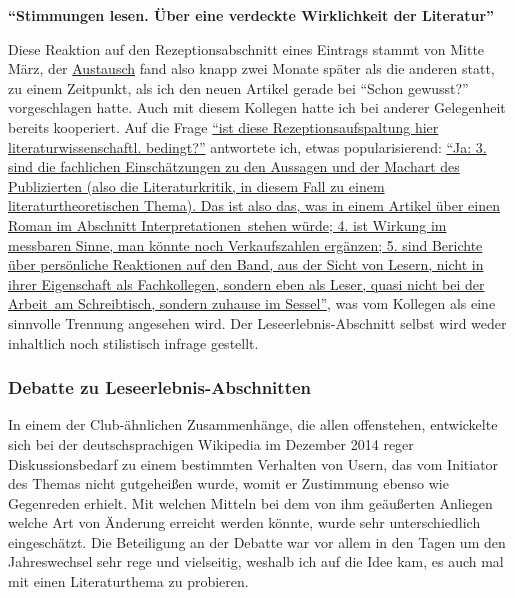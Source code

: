 \documentclass[fontsize=12pt]{scrartcl}
\begin{document}
\textbf{"`Stimmungen lesen. \"Uber eine verdeckte Wirklichkeit der Li\-te\-ra\-tur"'}

Diese Reaktion auf den Rezeptionsabschnitt eines Eintrags stammt von Mitte M\"arz, der \href{https://de.wikipedia.org/w/index.php?title=Diskussion:Stimmungen_lesen._\%C3\%9Cber_eine_verdeckte_Wirklichkeit_der_Literatur&oldid=139806486}{Austausch} fand also knapp zwei Monate sp\"ater als die anderen statt, zu einem Zeitpunkt, als ich den neuen Artikel gerade bei "`Schon gewusst?"' vorgeschlagen hatte. Auch mit diesem Kollegen\textsuperscript{\tiny *} hatte ich bei an\-de\-rer Gelegenheit bereits kooperiert. Auf die Frage \href{https://de.wikipedia.org/w/index.php?title=Diskussion:Stimmungen_lesen._\%C3\%9Cber_eine_verdeckte_Wirklichkeit_der_Literatur&diff=next&oldid=139796600}{"`ist diese Rezeptionsaufspaltung \mbox{hier} li\-te\-ra\-tur\-wissenschaftl. bedingt?"'} antwortete ich, etwas popularisierend: \href{https://de.wikipedia.org/w/index.php?title=Diskussion:Stimmungen_lesen._\%C3\%9Cber_eine_verdeckte_Wirklichkeit_der_Literatur&diff=next&oldid=139796600}{"`Ja: 3. sind die fachlichen Einsch\"atzungen zu den Aussagen und der Machart des Pu\-bli\-zierten (also die Li\-te\-ra\-tur\-kritik, in diesem Fall zu einem li\-te\-ra\-tur\-theo\-retischen Thema). Das ist also das, was in einem Artikel \"uber einen Roman im Abschnitt \flq Interpretationen\frq\, stehen w\"urde; 4. ist Wirkung im messbaren Sinne, man k\"onnte noch Verkaufszahlen erg\"anzen; 5. sind Berichte \"uber pers\"onliche Reaktionen auf den Band, aus der Sicht von \flq Lesern\frq, nicht in ihrer Eigenschaft als Fachkollegen, sondern eben als Leser, quasi nicht \flq bei der Arbeit\frq\, am Schreibtisch, sondern zuhause im Sessel"'}, was vom Kollegen\textsuperscript{\tiny *} als eine sinnvolle Trennung angesehen wird. Der Leseerlebnis-Abschnitt \mbox{selbst} wird weder inhaltlich noch stilistisch infrage gestellt.

\subsubsection{Debatte zu Leseerlebnis-Abschnitten}
\label{subsubsec:6.2.2}

In einem der Club-\"ahnlichen Zusammenh\"ange, die allen offenstehen, ent\-wickelte sich bei der deutschspra\-chi\-gen Wi\-ki\-pe\-dia im Dezember 2014 reger Dis\-kus\-si\-onsbedarf zu einem bestimmten Verhalten von Usern, das vom Initiator des Themas nicht gutgehei{\ss}en wurde, womit er Zustimmung ebenso wie Gegenreden erhielt. Mit welchen Mitteln bei dem von ihm ge\"au{\ss}erten Anliegen welche Art von \"Anderung erreicht werden k\"onnte, wurde sehr unterschiedlich eingesch\"atzt. Die Beteiligung an der Debatte war vor allem in den Tagen um den Jahreswechsel sehr rege und vielseitig, weshalb ich auf die Idee kam, es auch mal mit einen Li\-te\-ra\-tur\-thema zu probieren.
\end{document}
